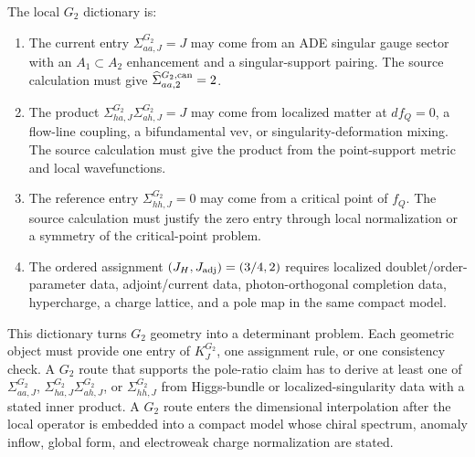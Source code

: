 The local \(G_2\) dictionary is:
\begin{enumerate}
\item The current entry \(\Sigma_{aa,J}^{G_2}=J\) may come from an ADE singular gauge sector with an \(A_1\subset A_2\) enhancement and a singular-support pairing.  The source calculation must give \(\widehat\Sigma_{aa,2}^{G_2,{\rm can}}=2\).
\item The product \(\Sigma_{ha,J}^{G_2}\Sigma_{ah,J}^{G_2}=J\) may come from localized matter at \(df_Q=0\), a flow-line coupling, a bifundamental vev, or singularity-deformation mixing.  The source calculation must give the product from the point-support metric and local wavefunctions.
\item The reference entry \(\Sigma_{hh,J}^{G_2}=0\) may come from a critical point of \(f_Q\).  The source calculation must justify the zero entry through local normalization or a symmetry of the critical-point problem.
\item The ordered assignment \((J_H,J_{\rm adj})=(3/4,2)\) requires localized doublet/order-parameter data, adjoint/current data, photon-orthogonal completion data, hypercharge, a charge lattice, and a pole map in the same compact model.
\end{enumerate}
This dictionary turns \(G_2\) geometry into a determinant problem.  Each geometric
object must provide one entry of \(K_J^{G_2}\), one assignment rule, or one
consistency check.  A \(G_2\) route that supports the pole-ratio claim has to
derive at least one of \(\Sigma_{aa,J}^{G_2}\),
\(\Sigma_{ha,J}^{G_2}\Sigma_{ah,J}^{G_2}\), or \(\Sigma_{hh,J}^{G_2}\) from
Higgs-bundle or localized-singularity data with a stated inner product.
A \(G_2\) route enters the dimensional interpolation after the local
operator is embedded into a compact model whose chiral spectrum, anomaly
inflow, global form, and electroweak charge normalization are stated.

